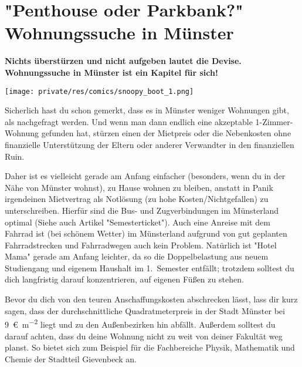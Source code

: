 \section[\texorpdfstring{"Penthouse oder Parkbank?"}{„Penthouse oder Parkbank?“} Wohnungssuche in Münster]{"Penthouse oder Parkbank?"\\Wohnungssuche in Münster}
\begin{multicols*}{2}
\textbf{Nichts überstürzen und nicht aufgeben lautet die Devise.
Wohnungssuche in Münster ist ein Kapitel für sich!}

\begin{center}
	\texttt{[image: private/res/comics/snoopy\_boot\_1.png]}
\end{center}

Sicherlich hast du schon gemerkt, dass es in Münster weniger Wohnungen gibt, als nachgefragt werden.
Und wenn man dann endlich eine akzeptable 1-Zimmer-Wohnung gefunden hat, stürzen einen der Mietpreis oder die Nebenkosten ohne finanzielle Unterstützung der Eltern oder anderer Verwandter in den finanziellen Ruin.

Daher ist es vielleicht gerade am Anfang einfacher (besonders, wenn du in der Nähe von Münster wohnst), zu Hause wohnen zu bleiben, anstatt in Panik irgendeinen Mietvertrag als Notlösung (zu hohe Kosten/Nichtgefallen) zu unterschreiben.
Hierfür sind die Bus- und Zugverbindungen im Münsterland optimal (Siehe auch Artikel "Semesterticket").
Auch eine Anreise mit dem Fahrrad ist (bei schönem Wetter) im Münsterland aufgrund von gut geplanten Fahrradstrecken und Fahrradwegen auch kein Problem.
Natürlich ist "Hotel Mama" gerade am Anfang leichter, da so die Doppelbelastung aus neuem Studiengang und eigenem Haushalt im 1.~Semester entfällt; trotzdem solltest du dich langfristig darauf konzentrieren, auf eigenen Füßen zu stehen.

Bevor du dich von den teuren Anschaffungskosten abschrecken lässt, lass dir kurz sagen, dass der durchschnittliche Quadratmeterpreis in der Stadt Münster bei \SI{9}{\euro\per\m\squared} liegt und zu den Außenbezirken hin abfällt.
Außerdem solltest du darauf achten, dass du deine Wohnung nicht zu weit von deiner Fakultät weg planst.
So bietet sich zum Beispiel für die Fachbereiche Physik, Mathematik und Chemie der Stadtteil Gievenbeck an.


\end{multicols*}
